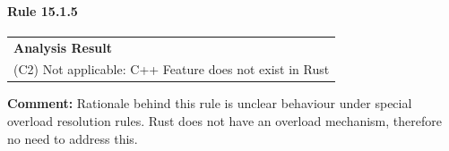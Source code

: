 \paragraph{Rule 15.1.5}
\begin{longtable}{p{13cm}}
\textbf{Analysis Result} \\
(C2) Not applicable: C++ Feature does not exist in Rust \\
\end{longtable}
\textbf{Comment:} Rationale behind this rule is unclear behaviour under special overload resolution rules. Rust does not have an overload mechanism, therefore no need to address this. \\
